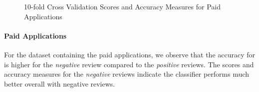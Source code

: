 \documentclass[11pt]{report} %
\begin{document}
\begin{figure}[h!]
\centering
{}
\caption[Optional caption for list of figures]{10-fold Cross Validation Scores and Accuracy Measures for Paid Applications }
\label{fig:subfigureExample}
\end{figure}

\paragraph{Paid Applications} For the dataset containing the paid applications, we observe that the accuracy for is higher for the \textit{negative} review compared to the \textit{positive} reviews. The scores and accuracy measures for the \textit{negative} reviews indicate the classifier performs much better overall with negative reviews.
\end{document}
